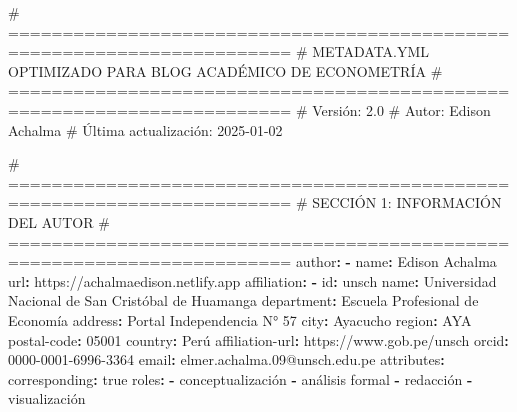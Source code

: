 \documentclass[
  doc,
  floatsintext,
  longtable,
  a4paper,
  nolmodern,
  notxfonts,
  notimes,
  12pt,
  colorlinks=true,linkcolor=blue,citecolor=blue,urlcolor=blue]{apa7}
\newenvironment{Shaded}{\begin{snugshade}}{\end{snugshade}}
\newcommand{\AttributeTok}[1]{\textcolor[rgb]{0.40,0.45,0.13}{#1}}
\newcommand{\CharTok}[1]{\textcolor[rgb]{0.13,0.47,0.30}{#1}}
\newcommand{\CommentTok}[1]{\textcolor[rgb]{0.37,0.37,0.37}{#1}}
\newcommand{\DecValTok}[1]{\textcolor[rgb]{0.68,0.00,0.00}{#1}}
\newcommand{\FunctionTok}[1]{\textcolor[rgb]{0.28,0.35,0.67}{#1}}
\newcommand{\KeywordTok}[1]{\textcolor[rgb]{0.00,0.23,0.31}{\textbf{#1}}}
\begin{document}
\begin{Shaded}
\begin{Highlighting}[]
\CommentTok{\# ========================================================================}
\CommentTok{\# METADATA.YML OPTIMIZADO PARA BLOG ACADÉMICO DE ECONOMETRÍA}
\CommentTok{\# ========================================================================}
\CommentTok{\# Versión: 2.0}
\CommentTok{\# Autor: Edison Achalma}
\CommentTok{\# Última actualización: 2025{-}01{-}02}

\CommentTok{\# ========================================================================}
\CommentTok{\# SECCIÓN 1: INFORMACIÓN DEL AUTOR}
\CommentTok{\# ========================================================================}
\FunctionTok{author}\KeywordTok{:}
\AttributeTok{  }\KeywordTok{{-}}\AttributeTok{ }\FunctionTok{name}\KeywordTok{:}\AttributeTok{ Edison Achalma}
\AttributeTok{    }\FunctionTok{url}\KeywordTok{:}\AttributeTok{ https://achalmaedison.netlify.app}
\AttributeTok{    }\FunctionTok{affiliation}\KeywordTok{:}
\AttributeTok{      }\KeywordTok{{-}}\AttributeTok{ }\FunctionTok{id}\KeywordTok{:}\AttributeTok{ unsch}
\AttributeTok{        }\FunctionTok{name}\KeywordTok{:}\AttributeTok{ Universidad Nacional de San Cristóbal de Huamanga}
\AttributeTok{        }\FunctionTok{department}\KeywordTok{:}\AttributeTok{ Escuela Profesional de Economía}
\AttributeTok{        }\FunctionTok{address}\KeywordTok{:}\AttributeTok{ Portal Independencia N° 57}
\AttributeTok{        }\FunctionTok{city}\KeywordTok{:}\AttributeTok{ Ayacucho}
\AttributeTok{        }\FunctionTok{region}\KeywordTok{:}\AttributeTok{ AYA}
\AttributeTok{        }\FunctionTok{postal{-}code}\KeywordTok{:}\AttributeTok{ }\DecValTok{05001}
\AttributeTok{        }\FunctionTok{country}\KeywordTok{:}\AttributeTok{ Perú}
\AttributeTok{    }\FunctionTok{affiliation{-}url}\KeywordTok{:}\AttributeTok{ https://www.gob.pe/unsch}
\AttributeTok{    }\FunctionTok{orcid}\KeywordTok{:}\AttributeTok{ 0000{-}0001{-}6996{-}3364}
\AttributeTok{    }\FunctionTok{email}\KeywordTok{:}\AttributeTok{ elmer.achalma.09@unsch.edu.pe}
\AttributeTok{    }\FunctionTok{attributes}\KeywordTok{:}
\AttributeTok{      }\FunctionTok{corresponding}\KeywordTok{:}\AttributeTok{ }\CharTok{true}
\AttributeTok{    }\FunctionTok{roles}\KeywordTok{:}
\AttributeTok{      }\KeywordTok{{-}}\AttributeTok{ conceptualización}
\AttributeTok{      }\KeywordTok{{-}}\AttributeTok{ análisis formal}
\AttributeTok{      }\KeywordTok{{-}}\AttributeTok{ redacción}
\AttributeTok{      }\KeywordTok{{-}}\AttributeTok{ visualización}


\end{Highlighting}
\end{Shaded}
\end{document}
